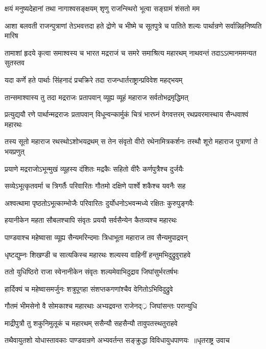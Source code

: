 \twolineshloka
{क्षयं मनुष्यदेहानां तथा नागाश्वसङ्क्षयम्}
{शृणु राजन्स्थिरो भूत्वा सङ्ग्रामं शंसतो मम}


आशा बलवती राजन्पुत्राणां तेऽभवत्तदा
\twolineshloka
{हते द्रोणे च भीष्मे च सूतपुत्रे च पातिते}
{शल्यः पार्थान्रणे सर्वान्निहनिष्यति मारिष}


\threelineshloka
{तामाशां हृदये कृत्वा समाश्वस्य च भारत}
{मद्रराजं च समरे समाश्रित्य महारथम्}
{नाथवन्तं तदाऽऽत्मानममन्यत सुतस्तव}


\twolineshloka
{यदा कर्णे हते पार्थाः सिंहनादं प्रचक्रिरे}
{तदा राजन्धार्तराष्ट्रान्प्रविवेश महद्भयम्}


\twolineshloka
{तान्समाश्वास्य तु तदा मद्रराजः प्रतापवान्}
{व्यूह्य व्यूहं महाराज सर्वतोभद्रमृद्धिमत्}


\threelineshloka
{प्रत्युद्ययौ रणे पार्थान्मद्रराजः प्रतापवान्}
{विधून्वन्कार्मुकं चित्रं भारघ्नं वेगवत्तरम्}
{रथप्रवरमास्थाय सैन्धवाश्वं महारथः}


\threelineshloka
{तस्य सूतो महाराज रथस्थोऽशोभयद्रथम्}
{स तेन संवृतो वीरो रथेनामित्रकर्शनः}
{तस्थौ शूरो महाराज पुत्राणां ते भयप्रणुत्}


\twolineshloka
{प्रयाणे मद्रराजोऽभून्मुखं व्यूहस्य दंशितः}
{मद्रकैः सहितो वीरैः कर्णपुत्रैश्च दुर्जयैः}


\twolineshloka
{सव्येऽभूत्कृतवर्मा च त्रिगर्तैः परिवारितः}
{गौतमो दक्षिणे पार्श्वे शकैश्च यवनैः सह}


\twolineshloka
{अश्वत्थामा पृष्ठतोऽभूत्काम्भोजैः परिवारितः}
{दुर्योधनोऽभवन्मध्ये रक्षितः कुरुपुङ्गवैः}


\twolineshloka
{हयानीकेन महता सौबलश्चापि संवृतः}
{प्रययौ सर्वसैन्येन कैतव्यश्च महारथः}


\twolineshloka
{पाण्डवाश्च महेष्वासा व्यूह्य सैन्यमरिन्दमाः}
{त्रिधाभूता महाराज तव सैन्यमुपाद्रवन्}


\twolineshloka
{धृष्टद्युम्नः शिखण्डी च सात्यकिस्च महारथः}
{शल्यस्य वाहिनीं हन्तुमभिदुद्रुवुराहवे}


\twolineshloka
{ततो युधिष्ठिरो राजा स्वेनानीकेन संवृतः}
{शल्यमेवाभिदुद्राव जिघांसुर्भरतर्षभः}


\twolineshloka
{हार्दिक्यं च महेष्वासमर्जुनः शत्रुपूगहा}
{संशप्तकगणांश्चैव वेगितोऽभिविदुद्रुवे}


\twolineshloka
{गौतमं भीमसेनो वै सोमकाश्च महारथाः}
{अभ्यद्रवन्त राजेनद््र जिघांसन्तः परान्युधि}


\twolineshloka
{माद्रीपुत्रौ तु शकुनिमुलूकं च महारथम्}
{ससैन्यौ सहसैन्यौ तावुपतस्थतुराहवे}


\threelineshloka
{तथैवायुतशो योधास्तावकाः पाण्डवान्रणे}
{अभ्यवर्तन्त सङ्क्रुद्धा विविधायुधपाणयः ॥धृतराष्ट्र उवाच}
{}


